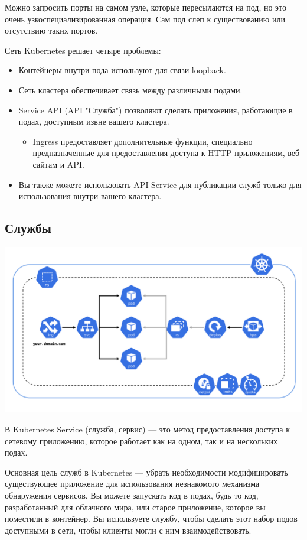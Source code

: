 \documentclass[a4page]{article}
\begin{document}
Можно запросить порты на самом узле, которые пересылаются на под, но это очень узкоспециализированная операция. Сам под слеп к существованию или отсутствию таких портов.

Сеть Kubernetes решает четыре проблемы:
\begin{itemize}
   \item Контейнеры внутри пода используют для связи loopback.
   \item Сеть кластера обеспечивает связь между различными подами.
   \item Service API (API "Служба") позволяют сделать приложения, работающие в подах, доступным извне вашего кластера.
     \begin{itemize}
       \item Ingress предоставляет дополнительные функции, специально предназначенные для предоставления доступа к HTTP-приложениям, веб-сайтам и API.
     \end{itemize}
   \item Вы также можете использовать API Service для публикации служб только для использования внутри вашего кластера.
\end{itemize}

\subsection{Службы}
\includegraphics[width=450pt]{service.png}

В Kubernetes Service (служба, сервис) --- это метод предоставления доступа к сетевому приложению, которое работает как на одном, так и на нескольких подах\cite{k8s:service}.

Основная цель служб в Kubernetes --- убрать необходимости модифицировать существующее приложение для использования незнакомого механизма обнаружения сервисов. Вы можете запускать код в подах, будь то код, разработанный для облачного мира, или старое приложение, которое вы поместили в контейнер. Вы используете службу, чтобы сделать этот набор подов доступными в сети, чтобы клиенты могли с ним взаимодействовать.
\end{document}

